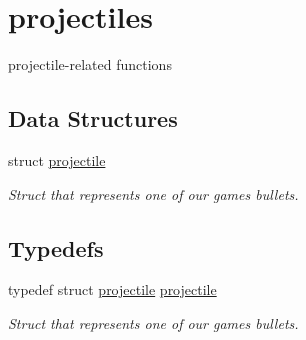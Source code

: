 \hypertarget{group__projectiles}{}\section{projectiles}
\label{group__projectiles}


projectile-\/related functions  


\subsection*{Data Structures}
\begin{DoxyCompactItemize}
\item 
struct \hyperlink{structprojectile}{projectile}
\begin{DoxyCompactList}\small\item\em Struct that represents one of our game\textquotesingle{}s bullets. \end{DoxyCompactList}\end{DoxyCompactItemize}
\subsection*{Typedefs}
\begin{DoxyCompactItemize}
\item 
typedef struct \hyperlink{structprojectile}{projectile} \hyperlink{group__projectiles_ga0ecdecffd31e7e21a2db68fb1aef8f23}{projectile}
\begin{DoxyCompactList}\small\item\em Struct that represents one of our game\textquotesingle{}s bullets. \end{DoxyCompactList}\end{DoxyCompactItemize}
